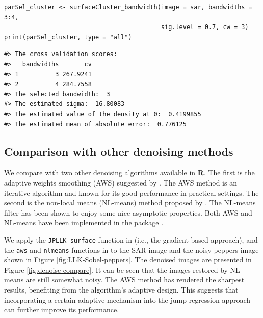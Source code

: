 \begin{verbatim}
parSel_cluster <- surfaceCluster_bandwidth(image = sar, bandwidths = 3:4, 
                                           sig.level = 0.7, cw = 3)
print(parSel_cluster, type = "all")
\end{verbatim}

\begin{verbatim}
#> The cross validation scores:
#>   bandwidths       cv
#> 1          3 267.9241
#> 2          4 284.7558
#> The selected bandwidth:  3 
#> The estimated sigma:  16.80083 
#> The estimated value of the density at 0:  0.4199855 
#> The estimated mean of absolute error:  0.776125
\end{verbatim}

\subsection{\texorpdfstring{{Comparison with other denoising methods}}{Comparison with other denoising methods}}\label{sec:denoise.compare}

We compare with two other denoising algorithms available in \textbf{R}. The first is the adaptive weights smoothing (AWS) suggested by \citet{polzehl2000adaptive}. The AWS method is an iterative algorithm and known for its good performance in practical settings. The second is the non-local means (NL-means) method proposed by \citet{buades2005review}. The NL-means filter has been shown to enjoy some nice asymptotic properties. Both AWS and NL-means have been implemented in the package  \citep{polzehl2023magnetic, polzehl2020patch}.

We apply the \texttt{JPLLK\_surface} function in  (i.e., the gradient-based approach), and the \texttt{aws} and \texttt{nlmeans} functions in  to the SAR image and the noisy peppers image shown in Figure \ref{fig:LLK-Sobel-peppers}. The denoised images are presented in Figure \ref{fig:denoise-compare}. It can be seen that the images restored by NL-means are still somewhat noisy. The AWS method has rendered the sharpest results, benefiting from the algorithm's adaptive design. This suggests that incorporating a certain adaptive mechanism into the jump regression approach can further improve its performance.



